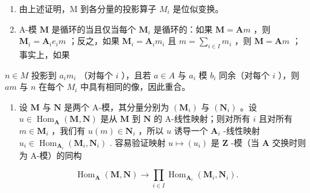 \begin{enumerate}
\def\labelenumi{\arabic{enumi})}
\setcounter{enumi}{1}
\item
  由上述证明，M 到各分量的投影算子 \(M_{i}\) 是位似变换。
\item
  A-模 \(\mathbf{M}\) 是循环的当且仅当每个 \(\mathbf{M}_i\) 是循环的：如果 \(\mathbf{M} = \mathbf{A}m\) ，则 \(\mathbf{M}_i = \mathbf{A}_i e_i m\) ；反之，如果 \(\mathbf{M}_i = \mathbf{A}_i m_i\) 且 \(m = \sum_{i \in I} m_i\) ，则 \(\mathbf{M} = \mathbf{A}m\) ；事实上，如果
\end{enumerate}

\(n \in M\) 投影到 \(a_i m_i\) （对每个 \(i\) ），且若 \(a \in A\) 与 \(a_i\) 模 \(b_i\) 同余（对每个 \(i\) ），则 \(am\) 与 \(n\) 在每个 \(M_i\) 中具有相同的像，因此重合。

\begin{enumerate}
\def\labelenumi{\arabic{enumi})}
\setcounter{enumi}{3}
\tightlist
\item
  设 \(\mathbf{M}\) 与 \(\mathbf{N}\) 是两个 A-模，其分量分别为 \((\mathbf{M}_i)\) 与 \((\mathbf{N}_i)\) 。设 \(u \in \operatorname{Hom}_{\mathbf{A}}(\mathbf{M}, \mathbf{N})\) 是从 \(\mathbf{M}\) 到 \(\mathbf{N}\) 的 A-线性映射；则对所有 \(i\) 且对所有 \(m \in \mathbf{M}_i\) ，我们有 \(u(m) \in \mathbf{N}_i\) ，所以 \(u\) 诱导一个 \(\mathbf{A}_i\) -线性映射 \(u_i \in \operatorname{Hom}_{\mathbf{A}_i}(\mathbf{M}_i, \mathbf{N}_i)\) . 容易验证映射 \(u \mapsto (u_i)\) 是 \(\mathbf{Z}\) -模（当 \(\mathbf{A}\) 交换时则为 A-模）的同构
\end{enumerate}

\[
\operatorname{Hom} _ {\mathbf {A}} (\mathbf {M}, \mathbf {N}) \rightarrow \prod_ {i \in I} \operatorname{Hom} _ {\mathbf {A} _ {i}} (\mathbf {M} _ {i}, \mathbf {N} _ {i}).
\]

